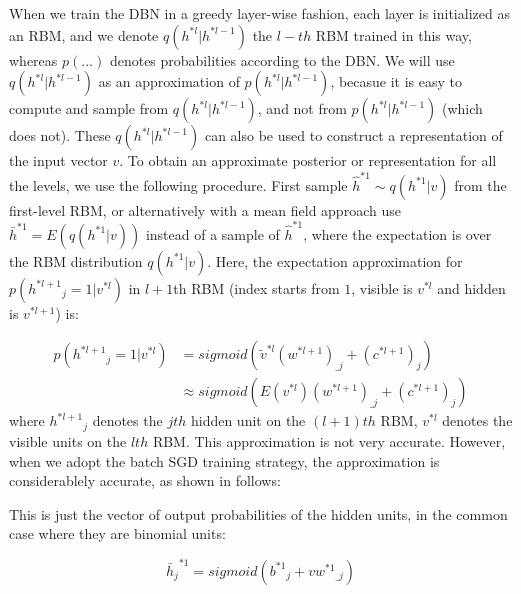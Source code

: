 \documentclass[runningheads,openany]{xhlPaper}
\begin{document}
When we train the DBN in a greedy layer-wise fashion, each layer is initialized as an RBM, and we denote $q\left(h^{*l}|h^{*l-1}\right)$ the $l-th$ RBM trained in this way, whereas $p\left(...\right)$ denotes probabilities according to the DBN.
We will use $q\left(h^{*l}|h^{*l-1}\right)$ as an approximation of $p\left(h^{*l}|h^{*l-1}\right)$, becasue it is easy to compute and sample from $q\left(h^{*l}|h^{*l-1}\right)$, and not from $p\left(h^{*l}|h^{*l-1}\right)$ (which does not).
These $q\left(h^{*l}|h^{*l-1}\right)$ can also be used to construct a representation of the input vector $v$.
To obtain an approximate posterior or representation for all the levels, we use the following procedure.
First sample ${\hat h^{*1}} \sim q\left( {{h^{*1}}|v} \right)$ from the first-level RBM, or alternatively with a mean field approach use ${{\bar h}^{*1}} = E\left( {q\left( {{h^{*1}}|v} \right)} \right)$ instead of a sample of ${{\hat h}^{*1}}$, where the expectation is over the RBM distribution $q\left( {{h^{*1}}|v} \right)$.
Here, the expectation approximation for $p\left( {{h^{*l + 1}}_j = 1|{v^{*l}}} \right)$ in $l + 1$th RBM (index starts from $1$, visible is $v^{*l}$ and hidden is $v^{*l+1}$) is:

\begin{displaymath}
\label{equ:equ_layers_rbm_mean_approximation}
\begin{aligned}
p\left( {{h^{*l + 1}}_j = 1|{v^{*l}}} \right) &= sigmoid\left( {{{\tilde v}^{*l}}{{\left( {{w^{*l + 1}}} \right)}_{\_j}} + {{\left( {{c^{*l + 1}}} \right)}_j}} \right)\\
 &\approx sigmoid\left( {E\left( {{v^{*l}}} \right){{\left( {{w^{*l + 1}}} \right)}_{\_j}} + {{\left( {{c^{*l + 1}}} \right)}_j}} \right)
\end{aligned}
\end{displaymath}
where ${h^{*l + 1}}_j$ denotes the $jth$ hidden unit on the $\left(l+1\right)th$ RBM,
$v^{*l}$ denotes the visible units on the $lth$ RBM.
This approximation is not very accurate. However, when we adopt the batch SGD training strategy, the approximation is considerablely accurate, as shown in follows:



This is just the vector of output probabilities of the hidden units, in the common case where they are binomial units:

\begin{displaymath}
{{\bar h}_j}^{*1} = sigmoid\left( {{b^{*1}}_j + v{w^{*1}}_{\_j}} \right)
\end{displaymath}
\end{document}
